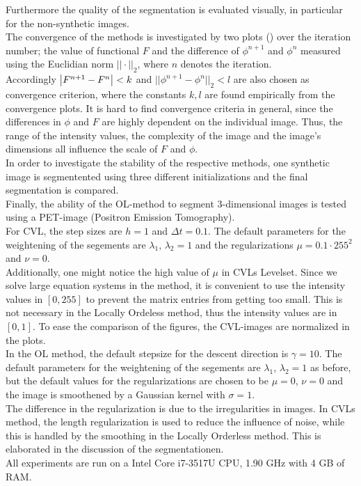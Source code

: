 Furthermore the quality of the segmentation is evaluated visually, in particular for the non-synthetic images.\\
The convergence of the methods is investigated by two plots () over the iteration number; the value of functional $F$ and the difference of $\phi^{n+1}$ and $\phi^n$ measured using the Euclidian norm $||\cdot||_2$, where $n$ denotes the iteration.\\
Accordingly $\left| {F^{n+1}-F^n} \right|<k$ and $||\phi^{n+1}-\phi^{n}||_2<l$ are also chosen as convergence criterion, where the constants $k,l$ are found empirically from the convergence plots. It is hard to find convergence criteria in general, since the differences in $\phi$ and $F$ are highly dependent on the individual image. Thus, the range of the intensity values, the complexity of the image and the image's dimensions all influence the scale of $F$ and $\phi$.\\
In order to investigate the stability of the respective methods, one synthetic image is segmentented using three different initializations and the final segmentation is compared.\\
Finally, the ability of the OL-method to segment 3-dimensional images is tested using a PET-image (Positron Emission Tomography).\\

For CVL, the step sizes are $h=1$ and $\Delta t=0.1$. The default parameters for the weightening of the segements are $\lambda_1,\,\lambda_2 = 1$ and the regularizations $\mu = 0.1\cdot 255^2$ and $\nu = 0$.\\
Additionally, one might notice the high value of $\mu$ in CVLs Levelset. Since we solve large equation systems in the method, it is convenient to use the intensity values in $[0,255]$ to prevent the matrix entries from getting too small. This is not necessary in the Locally Ordeless method, thus the intensity values are in $[0,1]$. To ease the comparison of the figures, the CVL-images are normalized in the plots.\\
In the OL method, the default stepsize for the descent direction is $\gamma = 10$. The default parameters for the weightening of the segements are $\lambda_1,\,\lambda_2 = 1$ as before, but the default values for the regularizations are chosen to be $\mu=0$, $\nu=0$ and the image is smoothened by a Gaussian kernel with $\sigma = 1$. \\
The difference in the regularization is due to the irregularities in images. In CVLs method, the length regularization is used to reduce the influence of noise, while this is handled by the smoothing in the Locally Orderless method. This is elaborated in the discussion of the segmentationen.\\
All experiments are run on a Intel Core i7-3517U CPU, 1.90 GHz with 4 GB of RAM.\\

